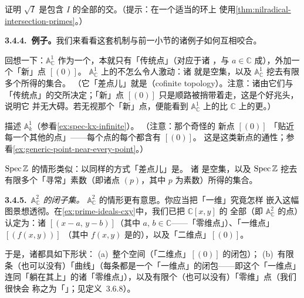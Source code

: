 \begin{exercise}[留待后用的练习]\label{ex:radical-intersection-primes}
证明 $\sqrt{I}$ 是包含 $I$ 的全部\trPrimeIdeal{}的交。（提示：在一个适当的环上
使用\cref{thm:nilradical-intersection-primes}。）
\end{exercise}

\textbf{3.4.4.\ 例子。}\quad 我们来看看这套机制与前一小节的诸例子如何互相咬合。

回想一下：$\mathbb{A}^1_{\mathbb{C}}$ 作为一个\trSet，本就只有「传统点」（对应于诸%
\trMaximalIdeal，与 $a\in\mathbb{C}$ 成\trBijection），外加一个「新」点 $[(0)]$。
$\mathbb{A}^1_{\mathbb{C}}$ 上的\trZariskiTopology{}不怎么令人激动：诸\trOpenSet{}
就是空集，以及 $\mathbb{A}^1_{\mathbb{C}}$ 挖去有限多个\trMaximalIdeal{}所得的集合。
（它「差点儿」就是\trCofiniteTopology{}（cofinite topology）。注意：诸\trOpenSet{}由它们与
「传统点」的交所决定；「新」点 $[(0)]$ 只是顺路被捎带着走，这是个好兆头，说明它
并无大碍。若无视那个「新」点，便能看到 $\mathbb{A}^1_{\mathbb{C}}$ 上的\trTopology{}比
$\mathbb{C}$ 上的\trClassicalTopology{}更\trCoarse。）

\begin{exercise}\label{ex:topological-space-a1k}
描述\trTopologicalSpace{} $\mathbb{A}^1_k$（参看\cref{ex:spec-kx-infinite}）。
（注意：那个奇怪的
新点 $[(0)]$ 「贴近每一个其他的点」——每个点的每个\trNeighborhood{}都含有 $[(0)]$。
这是这类新点的通性；参看\cref{ex:generic-point-near-every-point}。）
\end{exercise}

$\operatorname{Spec}\mathbb{Z}$ 的情形类似：\trTopology{}以同样的方式「差点儿」是\trCofiniteTopology{}。
诸\trOpenSet{}
是空集，以及 $\operatorname{Spec}\mathbb{Z}$ 挖去有限多个「寻常」素数（即诸点 $(p)$，其中 $p$
为素数）所得的集合。

\textbf{3.4.5.}\ \emph{$\mathbb{A}^2_{\mathbb{C}}$ 的闭子集。}\quad
$\mathbb{A}^2_{\mathbb{C}}$ 的情形更有意思。你应当把「一维\trPrimeIdeal」究竟怎样
嵌入这幅图景想透彻。在\cref{ex:prime-ideals-cxy}中，我们已把 $\mathbb{C}[x,y]$ 的
全部\trPrimeIdeal（即 $\mathbb{A}^2_{\mathbb{C}}$ 的点）认定为：诸\trMaximalIdeal{}
$[(x-a,\,y-b)]$（其中 $a,\,b\in\mathbb{C}$——「零维点」）、「一维点」$[(f(x,y))]$
（其中 $f(x,y)$ 是\trIrreducible{}的），以及「二维点」$[(0)]$。

于是，诸\trClosedSubset{}都具如下形状：
(a)~整个空间（「二维点」$[(0)]$ 的闭包）；
(b)~有限条（也可以没有）「曲线」（每条都是一个「一维点」的闭包——即这个「一维点」
连同「躺在其上」的诸「零维点」），以及有限个（也可以没有）「零维」点（我们很快会
称之为「\trClosedPoint」；见定义~3.6.8）。

